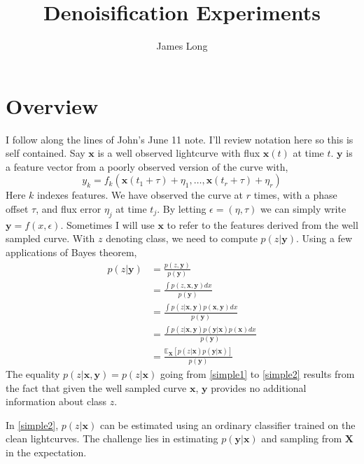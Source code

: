 \documentclass[10pt]{article}
\title{Denoisification Experiments}
\date{}
\author{James Long}
\begin{document}
\maketitle
\section{Overview}
I follow along the lines of John's June 11 note. I'll review notation here so this is self contained. Say $\mathbf{x}$ is a well observed lightcurve with flux $\mathbf{x}(t)$ at time $t$. $\mathbf{y}$ is a feature vector from a poorly observed version of the curve with,
\begin{equation}
y_k = f_k(\mathbf{x}(t_1 + \tau) + \eta_1, \ldots , \mathbf{x}(t_r + \tau) + \eta_r)
\end{equation}
Here $k$ indexes features. We have observed the curve at $r$ times, with a phase offset $\tau$, and flux error $\eta_j$ at time $t_j$. By letting $\epsilon = (\eta,\tau)$ we can simply write $\mathbf{y} = f(x,\epsilon)$. Sometimes I will use $\mathbf{x}$ to refer to the features derived from the well sampled curve. With $z$ denoting class, we need to compute $p(z|\mathbf{y})$. Using a few applications of Bayes theorem,
\begin{align}
p(z|\mathbf{y}) &= \frac{p(z,\mathbf{y})}{p(\mathbf{y})}\\
&= \frac{\int p(z,\mathbf{x},\mathbf{y}) dx}{p(\mathbf{y})}\\
&= \frac{\int p(z|\mathbf{x},\mathbf{y})p(\mathbf{x},\mathbf{y})dx}{p(\mathbf{y})}\\
&= \frac{\int p(z|\mathbf{x},\mathbf{y})p(\mathbf{y}|\mathbf{x})p(\mathbf{x})dx}{p(\mathbf{y})} \label{simple1} \\
&= \frac{\mathbb{E}_{\mathbf{X}} [p(z|\mathbf{x})p(\mathbf{y}|\mathbf{x})]}{p(\mathbf{y})} \label{simple2}
\end{align}
The equality $p(z|\mathbf{x},\mathbf{y}) = p(z|\mathbf{x})$ going from \eqref{simple1} to \eqref{simple2} results from the fact that given the well sampled curve $\mathbf{x}$, $\mathbf{y}$ provides no additional information about class $z$.

In \eqref{simple2}, $p(z|\mathbf{x})$ can be estimated using an ordinary classifier trained on the clean lightcurves. The challenge lies in estimating $p(\mathbf{y}|\mathbf{x})$ and sampling from $\mathbf{X}$ in the expectation.
\end{document}
